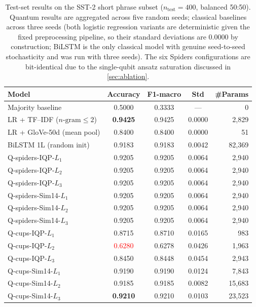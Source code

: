 \documentclass[runningheads]{llncs}
\begin{document}
\begin{table}[t]
\centering
\caption{Test-set results on the SST-2 short phrase subset
(\(n_\text{test}=400\), balanced 50:50). Quantum results are
aggregated across five random seeds; classical baselines across three
seeds (both logistic regression variants are deterministic given the
fixed preprocessing pipeline, so their standard deviations are
\(0.0000\) by construction; BiLSTM is the only classical model with
genuine seed-to-seed stochasticity and was run with three seeds). The six Spiders configurations are
bit-identical due to the single-qubit ansatz saturation discussed in
\cref{sec:ablation}.}
\label{tab:results}
\begin{tabular}{lcccr}
\toprule
Model & Accuracy & F1-macro & Std & \#Params \\
\midrule
Majority baseline & 0.5000 & 0.3333 & --- & 0 \\
\midrule
LR + TF--IDF (\(n\text{-gram}\leq 2\)) & \textbf{0.9425} & 0.9425 & 0.0000 & 2{,}829 \\
LR + GloVe-50d (mean pool) & 0.8400 & 0.8400 & 0.0000 & 51 \\
BiLSTM 1L (random init) & 0.9183 & 0.9183 & 0.0042 & 82{,}369 \\
\midrule
Q-spiders-IQP-\(L_1\) & 0.9205 & 0.9205 & 0.0064 & 2{,}940 \\
Q-spiders-IQP-\(L_2\) & 0.9205 & 0.9205 & 0.0064 & 2{,}940 \\
Q-spiders-IQP-\(L_3\) & 0.9205 & 0.9205 & 0.0064 & 2{,}940 \\
Q-spiders-Sim14-\(L_1\) & 0.9205 & 0.9205 & 0.0064 & 2{,}940 \\
Q-spiders-Sim14-\(L_2\) & 0.9205 & 0.9205 & 0.0064 & 2{,}940 \\
Q-spiders-Sim14-\(L_3\) & 0.9205 & 0.9205 & 0.0064 & 2{,}940 \\
\midrule
Q-cups-IQP-\(L_1\) & 0.8715 & 0.8710 & 0.0165 & 983 \\
Q-cups-IQP-\(L_2\) & \textcolor{red}{0.6280} & 0.6278 & 0.0426 & 1{,}963 \\
Q-cups-IQP-\(L_3\) & 0.8450 & 0.8448 & 0.0454 & 2{,}943 \\
Q-cups-Sim14-\(L_1\) & 0.9190 & 0.9190 & 0.0124 & 7{,}843 \\
Q-cups-Sim14-\(L_2\) & 0.9185 & 0.9185 & 0.0082 & 15{,}683 \\
Q-cups-Sim14-\(L_3\) & \textbf{0.9210} & 0.9210 & 0.0103 & 23{,}523 \\
\bottomrule
\end{tabular}
\end{table}
\end{document}
